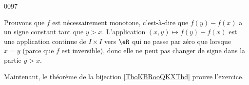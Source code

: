 
\begin{corrige}{0097}

	Prouvons que $f$ est nécessairement monotone, c'est-à-dire que $f(y)-f(x)$ a un signe constant tant que $y>x$. L'application $(x,y)\mapsto f(y)-f(x)$ est une application continue de $I\times I$ vers $\eR$ qui ne passe par zéro que lorsque $x=y$ (parce que $f$ est inversible), donc elle ne peut pas changer de signe dans la partie $y>x$.

	Maintenant, le théorème de la bijection \ref{ThoKBRooQKXThd} prouve l'exercice.

\end{corrige}
